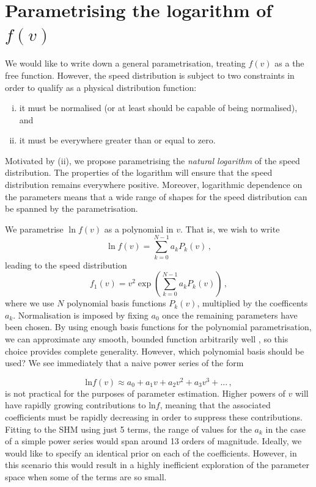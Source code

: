 \section{Parametrising the logarithm of $f(v)$}
\label{sec:Poly:parametrisation}

We would like to write down a general parametrisation, treating $f(v)$ as a the free function. However, the speed distribution is subject to two constraints in order to qualify as a physical distribution function:
\begin{enumerate}[(i)]
\item it must be normalised (or at least should be capable of being normalised), and
\item it must be everywhere greater than or equal to zero.
\end{enumerate}
Motivated by (ii), we propose parametrising the \textit{natural logarithm} of the speed distribution. The properties of the logarithm will ensure that the speed distribution remains everywhere positive. Moreover, logarithmic dependence on the parameters means that a wide range of shapes for the speed distribution can be spanned by the parametrisation. 

We parametrise $\ln f(v)$ as a polynomial in $v$. That is, we wish to write
\begin{equation}
\ln f(v) = \sum_{k = 0}^{N-1} a_k P_k(v)\,,
\end{equation}
leading to the speed distribution
\begin{equation}
f_1(v) = v^2 \exp\left( \sum_{k = 0}^{N-1} a_k P_k(v)\right)\,,
\end{equation}
where we use $N$ polynomial basis functions $P_k(v)$, multiplied by the coefficents $a_k$. Normalisation is imposed by fixing $a_0$ once the remaining parameters have been chosen. By using enough basis functions for the polynomial parametrisation, we can approximate any smooth, bounded function arbitrarily well \cite{Press:2007}, so this choice provides complete generality. However, which polynomial basis should be used? We see immediately that a naive power series of the form

\begin{equation}
\textrm{ln}f(v) \approx a_0 + a_1 v + a_2 v^2 + a_3 v^3 + ...\,,
\end{equation}
is not practical for the purposes of parameter estimation. Higher powers of $v$ will have rapidly growing contributions to $\textrm{ln} f$, meaning that the associated coefficients must be rapidly decreasing in order to suppress these contributions. Fitting to the SHM using just 5 terms, the range of values for the $a_k$ in the case of a simple power series would span around 13 orders of magnitude. Ideally, we would like to specify an identical prior on each of the coefficients. However, in this scenario this would result in a highly inefficient exploration of the parameter space when some of the terms are so small.

